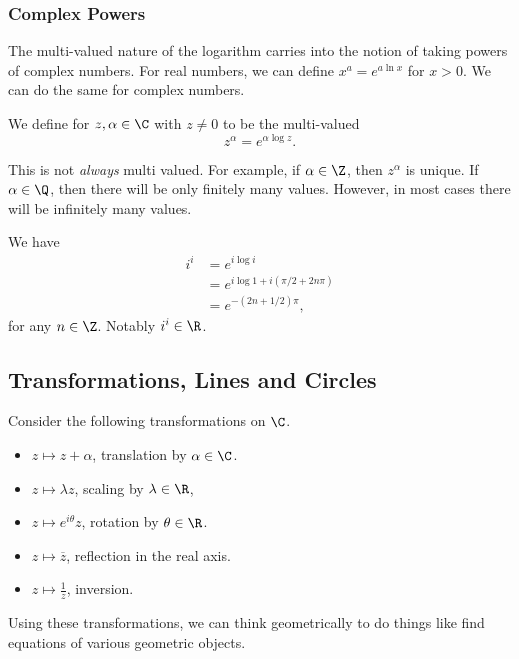 \subsubsection{Complex Powers}

The multi-valued nature of the logarithm carries into the notion of taking powers of complex numbers.
For real numbers, we can define $x^a = e^{a \ln x}$ for $x > 0$. We can do the same for complex numbers.

\begin{definition}
	We define  for $z, \alpha \in \C$ with $z \neq 0$ to be the multi-valued
	$$
	z^{\alpha} = e^{\alpha \log z}.
	$$
\end{definition}

This is not \emph{always} multi valued. For example, if $\alpha \in \Z$, then $z^\alpha$ is unique. If $\alpha \in \Q$, then there will be only finitely many values. However, in most cases there will be infinitely many values.

\begin{example}[Calculating $i^i$]
	We have
	\begin{align*}
		i^i &= e^{i \log i} \\
		&= e^{i \log 1 + i(\pi/2 + 2n\pi)} \\
		&= e^{-(2n + 1/2)\pi},
	\end{align*}
	for any $n \in \Z$. Notably $i^i \in \R$.
\end{example}


\subsection{Transformations, Lines and Circles}

Consider the following transformations on $\C$.
\begin{itemize}
	\item $z \mapsto z + \alpha$, translation by $\alpha \in \C$.
	\item $z \mapsto \lambda z$, scaling by $\lambda \in \R$,
	\item $z \mapsto e^{i \theta} z$, rotation by $\theta \in \R$. 
	\item $z \mapsto \overline{z}$, reflection in the real axis.
	\item $z \mapsto \frac{1}{z}$, inversion.
\end{itemize}
Using these transformations, we can think geometrically to do things like find equations of various geometric objects.

